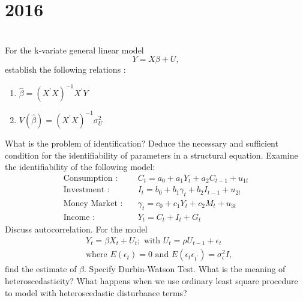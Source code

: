 \section*{2016}
\vspace{-.5cm}
\hrulefill \smallskip\\
 For the k-variate general linear model \[ Y = X\beta + U,\] establish the following relations :
\begin{enumerate}[label=(\roman*)]
\itemsep0em 
\item $\hat{\beta} = (X^{\prime}X)^{-1}X^{\prime}Y $
\item $V(\hat{\beta}) = (X^{\prime}X)^{-1}\sigma^2_U$
\end{enumerate}
 What is the problem of identification? Deduce the necessary and sufficient condition for the identifiability of parameters in a structural equation. Examine the identifiability of the following model: \[ \begin{aligned} \text{Consumption :} \quad &C_t = a_0 + a_1Y_t +a_2C_{t-1} + u_{1t} \\
\text{Investment :} \quad&I_t = b_0 +b_1\gamma_t+b_2I_{t-1} + u_{2t} \\
\text{Money Market :} \quad &\gamma_t = c_0 + c_1Y_t + c_2M_t + u_{3t} \\
\text{Income :} \quad &Y_t = C_t + I_t + G_t
\end{aligned}\]
 Discuss autocorrelation. For the model\[ \begin{aligned}
&Y_t = \beta X_t + U_t; \text{ with } U_t = \rho U_{t-1} + \epsilon_t \\
&\text{where } E(\epsilon_t) = 0 \text{ and } E(\epsilon_t\epsilon_{t^{\prime}}) = \sigma^2_{\epsilon}I,
\end{aligned} \] find the estimate of $\beta$. Specify Durbin-Watson Test.
\myline
{} What is the meaning of heteroscedasticity? What happens when we use ordinary least square procedure to model with heteroscedastic disturbance terms?